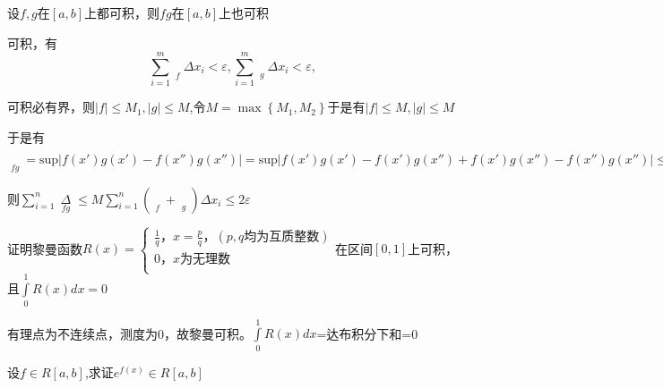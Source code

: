 \documentclass[lang=cn,10pt]{elegantbook}
\begin{document}
\begin{example}
	设$f,g$在$[a,b]$上都可积，则$fg$在$[a,b]$上也可积
\end{example}
\begin{solution}
	
	可积，有
	\begin{equation*}
		\sum_{i=1}^m{\mathop {\omega _i} \limits_{f}\varDelta x_i<\varepsilon ,}\sum_{i=1}^m{\mathop {\omega _i} \limits_{g}\varDelta x_i<\varepsilon ,}
	\end{equation*}
	
	可积必有界，则$|f|\le M_{1},|g|\le M$,令$M=\max \left\{ M_1,M_2 \right\} $于是有$|f|\le M,|g|\le M$
	
	于是有$ \mathop {\omega _i} \limits_{fg}=\mathrm{sup}|f\left( x\prime \right) g\left( x\prime \right) -f\left( x'' \right) g\left( x'' \right) |=\mathrm{sup}|f\left( x\prime \right) g\left( x\prime \right) -f\left( x\prime \right) g\left( x'' \right) +f\left( x\prime \right) g\left( x'' \right) -f\left( x'' \right) g\left( x'' \right) |\le \mathrm{sup}|f\left( x\prime \right) g\left( x\prime \right) -f\left( x\prime \right) g\left( x'' \right) |+\mathrm{sup}|f\left( x\prime \right) g\left( x'' \right) -f\left( x'' \right) g\left( x'' \right) |\le M\left( \mathop {w_i} \limits_{f}+\mathop {\omega _i} \limits_{g} \right) 
		$
		
	则$\sum_{i=1}^n{\mathop {\omega _i\varDelta x_i} \limits_{fg}}\le M\sum_{i=1}^n{\left( \mathop {w_i} \limits_{f}+\mathop {\omega _i} \limits_{g} \right) \varDelta x_i\le 2\varepsilon}
	$
\end{solution}
\begin{example}
	证明黎曼函数$R\left( x \right) =\begin{cases}
		\frac{1}{q}\text{，}x=\frac{p}{q}\text{，}\left( p,q\text{均为互质整数} \right)\\
		0\text{，}x\text{为无理数}\\
	\end{cases}$在区间$[0,1]$上可积，且$\int\limits_0^1{R\left( x \right) dx}=0
	$
\end{example}
\begin{solution}
	
	有理点为不连续点，测度为0，故黎曼可积。$\int\limits_0^1{R\left( x \right) dx}$=达布积分下和=0
\end{solution}
\begin{example}
	设$f\in R[a,b]$,求证$e^{f(x)}\in R[a,b]$
\end{example}
\end{document}

